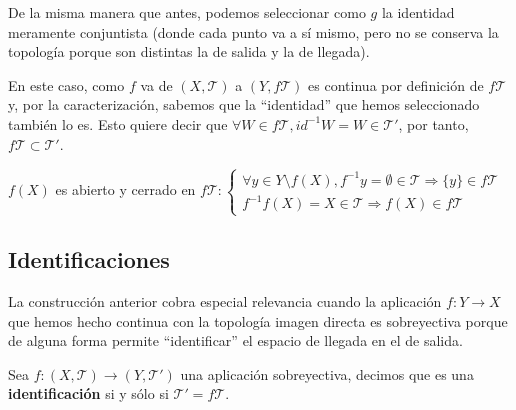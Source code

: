 \begin{demo}
\begin{itemize}
    De la misma manera que antes, podemos seleccionar como $g$ la identidad meramente conjuntista (donde cada punto va a sí mismo, pero no se conserva la topología porque son distintas la de salida y la de llegada). 
    \begin{figure}[H]
        \centering    
    \end{figure}
	En este caso, como $f$ va de $(X,\mathcal{T})$ a $(Y, f\mathcal{T})$ es continua por definición de $f\mathcal{T}$ y, por la caracterización, sabemos que la ``identidad'' que hemos seleccionado también lo es. Esto quiere decir que $\forall W \in f\mathcal{T}, id^{-1} W = W \in \mathcal{T}'$, por tanto, $f\mathcal{T}\subset \mathcal{T}'$.
\end{itemize}
\end{demo}

\begin{obs}
$f\left( X \right)$ es abierto y cerrado en $f\mathcal{T}: \begin{cases}
    \forall y \in Y \setminus f\left( X \right), f^{-1}y = \emptyset \in \mathcal{T} \Rightarrow \{y\} \in f\mathcal{T}\\
    f^{-1}f\left( X \right) = X \in \mathcal{T} \Rightarrow f\left( X \right) \in f\mathcal{T}
\end{cases}$
\end{obs}

\subsection{Identificaciones}
\label{sub:identificaciones}
La construcción anterior cobra especial relevancia cuando la aplicación $f: Y \rightarrow X$ que hemos hecho continua con la topología imagen directa es sobreyectiva porque de alguna forma permite ``identificar'' el espacio de llegada en el de salida.

\begin{defi}[Identificación]
Sea $f: \left( X, \mathcal{T} \right) \rightarrow \left( Y, \mathcal{T}' \right)$ una aplicación sobreyectiva, decimos que es una \textbf{identificación} si y sólo si $\mathcal{T}' = f\mathcal{T}$.
\end{defi}


